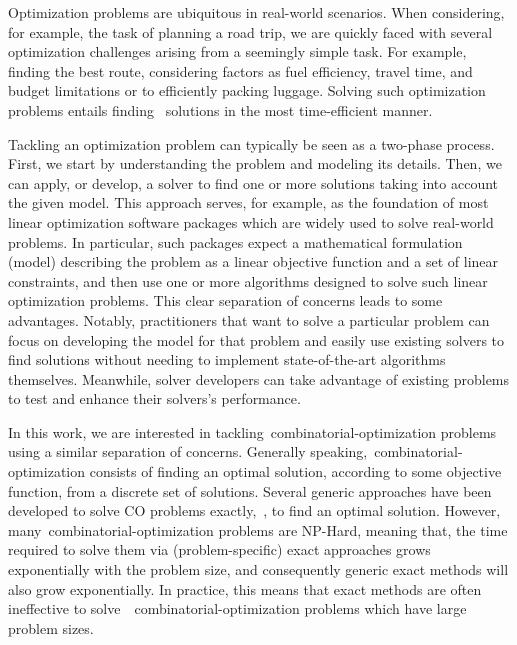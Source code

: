 Optimization problems are ubiquitous in real-world scenarios. When considering,
for example, the task of planning a road trip, we are quickly faced with several
optimization challenges arising from a seemingly simple task. For example,
finding the best route, considering factors as fuel efficiency, travel time, and
budget limitations or to efficiently packing luggage. Solving such optimization
problems entails finding~ solutions in the most time-efficient manner.

Tackling an optimization problem can typically be seen as a two-phase process.
First, we start by understanding the problem and modeling its details. Then, we
can apply, or develop, a solver to find one or more solutions taking into
account the given model. This approach serves, for example, as the foundation of
most linear optimization software packages which are widely used to solve
real-world problems. In particular, such packages expect a mathematical
formulation (model) describing the problem as a linear objective function and a
set of linear constraints, and then use one or more algorithms designed to solve
such linear optimization problems. This clear separation of concerns leads to
some advantages. Notably, practitioners that want to solve a particular problem
can focus on developing the model for that problem and easily use existing
solvers to find solutions without needing to implement state-of-the-art
algorithms themselves. Meanwhile, solver developers can take advantage of
existing problems to test and enhance their solvers's performance.

In this work, we are interested in tackling~\acrfull{combinatorial-optimization}
problems using a similar separation of concerns. Generally
speaking,~\acrshort{combinatorial-optimization} consists of finding an optimal
solution, according to some objective function, from a discrete set of
solutions. Several generic approaches have been developed to solve CO problems
exactly,~\ie{}, to find an optimal solution. However,
many~\acrshort{combinatorial-optimization} problems are NP-Hard, meaning that,
the time required to solve them via (problem-specific) exact approaches grows
exponentially with the problem size, and consequently generic exact methods will
also grow exponentially. In practice, this means that exact methods are often
ineffective to
solve~~\acrshort{combinatorial-optimization} problems
which have large problem sizes.

